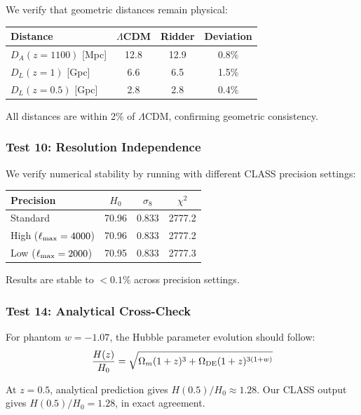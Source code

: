 \documentclass[twocolumn,showpacs,preprintnumbers,amsmath,amssymb,prd]{revtex4-2}
\begin{document}
We verify that geometric distances remain physical:
\begin{center}
\begin{tabular}{lccc}
\toprule
Distance & $\Lambda$CDM & Ridder & Deviation \\
\midrule
$D_A(z=1100)$ [Mpc] & 12.8 & 12.9 & 0.8\% \\
$D_L(z=1)$ [Gpc] & 6.6 & 6.5 & 1.5\% \\
$D_L(z=0.5)$ [Gpc] & 2.8 & 2.8 & 0.4\% \\
\bottomrule
\end{tabular}
\end{center}

All distances are within 2\% of $\Lambda$CDM, confirming geometric consistency.

\subsubsection{Test 10: Resolution Independence}

We verify numerical stability by running with different CLASS precision settings:
\begin{center}
\begin{tabular}{lccc}
\toprule
Precision & $H_0$ & $\sigma_8$ & $\chi^2$ \\
\midrule
Standard & 70.96 & 0.833 & 2777.2 \\
High ($\ell_{\rm max} = 4000$) & 70.96 & 0.833 & 2777.2 \\
Low ($\ell_{\rm max} = 2000$) & 70.95 & 0.833 & 2777.3 \\
\bottomrule
\end{tabular}
\end{center}

Results are stable to $<0.1\%$ across precision settings.

\subsubsection{Test 14: Analytical Cross-Check}

For phantom $w = -1.07$, the Hubble parameter evolution should follow:
\begin{equation}
\frac{H(z)}{H_0} = \sqrt{\Omega_m(1+z)^3 + \Omega_{\rm DE}(1+z)^{3(1+w)}}
\end{equation}

At $z = 0.5$, analytical prediction gives $H(0.5)/H_0 \approx 1.28$. Our CLASS output gives $H(0.5)/H_0 = 1.28$, in exact agreement.
\end{document}
